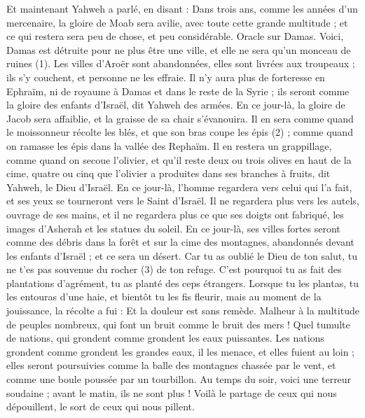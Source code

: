 \begin{multicols}{2}
Et maintenant Yahweh a parlé, en disant : Dans trois ans, comme les années d’un mercenaire, la gloire de Moab sera avilie, avec toute cette grande multitude ; et ce qui restera sera peu de chose, et peu considérable.
\VerseOne{}Oracle sur Damas. Voici, Damas est détruite pour ne plus être une ville, et elle ne sera qu'un monceau de ruines (1).
Les villes d'Aroër sont abandonnées, elles sont livrées aux troupeaux ; ils s’y couchent, et personne ne les effraie.
Il n'y aura plus de forteresse en Ephraïm, ni de royaume à Damas et dans le reste de la Syrie ; ils seront comme la gloire des enfants d'Israël, dit Yahweh des armées.
En ce jour-là, la gloire de Jacob sera affaiblie, et la graisse de sa chair s’évanouira.
Il en sera comme quand le moissonneur récolte les blés, et que son bras coupe les épis (2) ; comme quand on ramasse les épis dans la vallée des Rephaïm.
Il en restera un grappillage, comme quand on secoue l'olivier, et qu'il reste deux ou trois olives en haut de la cime, quatre ou cinq que l'olivier a produites dans ses branches à fruits, dit Yahweh, le Dieu d'Israël.
En ce jour-là, l'homme regardera vers celui qui l’a fait, et ses yeux se tourneront vers le Saint d'Israël.
Il ne regardera plus vers les autels, ouvrage de ses mains, et il ne regardera plus ce que ses doigts ont fabriqué, les images d’Asherah et les statues du soleil.
En ce jour-là, ses villes fortes seront comme des débris dans la forêt et sur la cime des montagnes, abandonnés devant les enfants d'Israël ; et ce sera un désert.
Car tu as oublié le Dieu de ton salut, tu ne t'es pas souvenue du rocher (3) de ton refuge. C’est pourquoi tu as fait des plantations d’agrément, tu as planté des ceps étrangers.
Lorsque tu les plantas, tu les entouras d’une haie, et bientôt tu les fis fleurir, mais au moment de la jouissance, la récolte a fui : Et la douleur est sans remède.
Malheur à la multitude de peuples nombreux, qui font un bruit comme le bruit des mers ! Quel tumulte de nations, qui grondent comme grondent les eaux puissantes.
Les nations grondent comme grondent les grandes eaux, il les menace, et elles fuient au loin ; elles seront poursuivies comme la balle des montagnes chassée par le vent, et comme une boule poussée par un tourbillon.
Au temps du soir, voici une terreur soudaine ; avant le matin, ils ne sont plus ! Voilà le partage de ceux qui nous dépouillent, le sort de ceux qui nous pillent.

\end{multicols}
